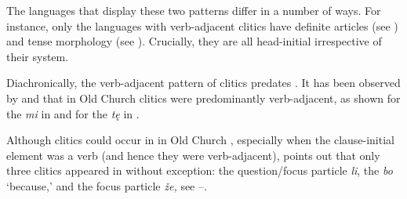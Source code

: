 \documentclass[output=paper,modfonts,newtxmath,hidelinks]{langscibook}
\begin{document}
\ea \label{11:ex7}
	\label{11:ex7a}
 	\label{11:ex7b}
 	\z
\z
The  languages that display these two  patterns differ in a number of ways. For instance, only the languages with verb-adjacent clitics have definite articles (see \citealt{boskovic2016}) and tense morphology (see \citealt{migdalski2015,migdalski2016}). Crucially, they are all head-initial irrespective of their  system.

Diachronically, the verb-adjacent pattern of clitics predates . It has been observed by \citet{radanovickocic1988} and \citet{pancheva2005} that in Old Church   clitics were predominantly verb-adjacent, as shown for the   \textit{mi} in  and for the   \textit{tę} in .

\ea \label{11:ex8}
	\label{11:ex8a}
	\label{11:ex8b}
	\z
\z
Although  clitics could occur in  in Old Church , especially when the clause-initial element was a verb (and hence they were verb-adjacent), \citet{radanovickocic1988} points out that only three clitics appeared in  without exception: the question/focus particle \textit{li}, the   \textit{bo} ‘because,’ and the focus particle \textit{že,} see --. 
\end{document}
